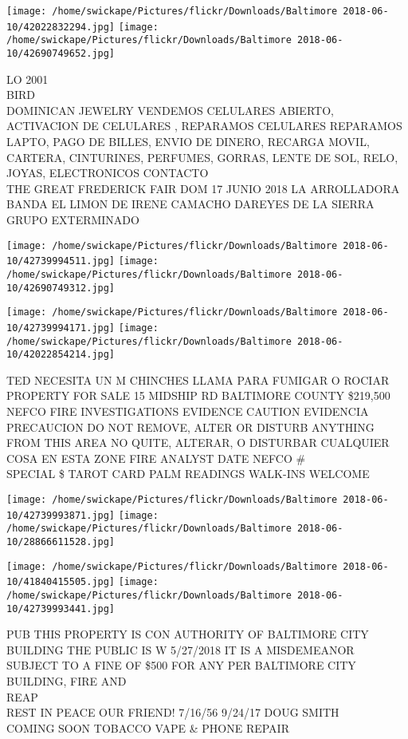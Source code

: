 \documentclass[10pt,letterpaper]{article}
\begin{document}
\texttt{[image: /home/swickape/Pictures/flickr/Downloads/Baltimore 2018-06-10/42022832294.jpg]}
\texttt{[image: /home/swickape/Pictures/flickr/Downloads/Baltimore 2018-06-10/42690749652.jpg]}

LO 2001\\
BIRD\\
DOMINICAN JEWELRY VENDEMOS CELULARES ABIERTO, ACTIVACION DE CELULARES , REPARAMOS CELULARES REPARAMOS LAPTO, PAGO DE BILLES, ENVIO DE DINERO, RECARGA MOVIL, CARTERA, CINTURINES, PERFUMES, GORRAS, LENTE DE SOL, RELO, JOYAS, ELECTRONICOS CONTACTO\\
THE GREAT FREDERICK FAIR DOM 17 JUNIO 2018 LA ARROLLADORA BANDA EL LIMON DE IRENE CAMACHO DAREYES DE LA SIERRA GRUPO EXTERMINADO
\pagebreak

\texttt{[image: /home/swickape/Pictures/flickr/Downloads/Baltimore 2018-06-10/42739994511.jpg]}
\texttt{[image: /home/swickape/Pictures/flickr/Downloads/Baltimore 2018-06-10/42690749312.jpg]}

\texttt{[image: /home/swickape/Pictures/flickr/Downloads/Baltimore 2018-06-10/42739994171.jpg]}
\texttt{[image: /home/swickape/Pictures/flickr/Downloads/Baltimore 2018-06-10/42022854214.jpg]}

TED NECESITA UN M CHINCHES LLAMA PARA FUMIGAR O ROCIAR\\
PROPERTY FOR SALE 15 MIDSHIP RD BALTIMORE COUNTY \$219,500\\
NEFCO FIRE INVESTIGATIONS EVIDENCE CAUTION EVIDENCIA PRECAUCION DO NOT REMOVE, ALTER OR DISTURB ANYTHING FROM THIS AREA NO QUITE, ALTERAR, O DISTURBAR CUALQUIER COSA EN ESTA ZONE FIRE ANALYST DATE NEFCO \#\\
SPECIAL \$ TAROT CARD PALM READINGS WALK{-}INS WELCOME
\pagebreak

\texttt{[image: /home/swickape/Pictures/flickr/Downloads/Baltimore 2018-06-10/42739993871.jpg]}
\texttt{[image: /home/swickape/Pictures/flickr/Downloads/Baltimore 2018-06-10/28866611528.jpg]}

\texttt{[image: /home/swickape/Pictures/flickr/Downloads/Baltimore 2018-06-10/41840415505.jpg]}
\texttt{[image: /home/swickape/Pictures/flickr/Downloads/Baltimore 2018-06-10/42739993441.jpg]}

PUB THIS PROPERTY IS CON AUTHORITY OF BALTIMORE CITY BUILDING THE PUBLIC IS W 5/27/2018 IT IS A MISDEMEANOR SUBJECT TO A FINE OF \$500 FOR ANY PER BALTIMORE CITY BUILDING, FIRE AND\\
REAP\\
REST IN PEACE OUR FRIEND!  7/16/56 9/24/17 DOUG SMITH\\
COMING SOON TOBACCO VAPE \& PHONE REPAIR
\pagebreak
\end{document}
